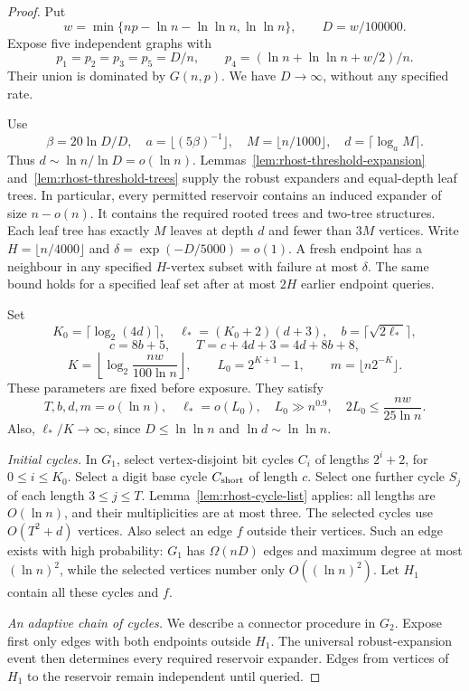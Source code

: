 \begin{proof}
Put
\[
 w=\min\{np-\ln n-\ln\ln n,\ln\ln n\},\qquad D=w/100000.
\]
Expose five independent graphs with
\[
 p_1=p_2=p_3=p_5=D/n,\qquad
 p_4=(\ln n+\ln\ln n+w/2)/n.
\]
Their union is dominated by $G(n,p)$.
We have $D\to\infty$, without any specified rate.

Use
\[
 \beta=20\ln D/D,\quad a=\lfloor(5\beta)^{-1}\rfloor,\quad
 M=\lfloor n/1000\rfloor,\quad d=\lceil\log_a M\rceil.
\]
Thus $d\sim\ln n/\ln D=o(\ln n)$.
Lemmas~\ref{lem:rhost-threshold-expansion} and~\ref{lem:rhost-threshold-trees} supply the robust expanders and equal-depth leaf trees.
In particular, every permitted reservoir contains an induced expander of size $n-o(n)$.
It contains the required rooted trees and two-tree structures.
Each leaf tree has exactly $M$ leaves at depth $d$ and fewer than $3M$ vertices.
Write $H=\lfloor n/4000\rfloor$ and $\delta=\exp(-D/5000)=o(1)$.
A fresh endpoint has a neighbour in any specified $H$-vertex subset with failure at most $\delta$.
The same bound holds for a specified leaf set after at most $2H$ earlier endpoint queries.

Set
\[
 K_0=\lceil\log_2(4d)\rceil,\quad
 \ell_*=(K_0+2)(d+3),\quad b=\lceil\sqrt{2\ell_*}\rceil,
\]
\[
 c=8b+5,\qquad T=c+4d+3=4d+8b+8,
\]
\[
 K=\left\lfloor\log_2\frac{nw}{100\ln n}\right\rfloor,
 \qquad L_0=2^{K+1}-1,\qquad m=\lfloor n2^{-K}\rfloor.
\]
These parameters are fixed before exposure.
They satisfy
\[
 T,b,d,m=o(\ln n),\quad \ell_*=o(L_0),\quad L_0\gg n^{0.9},
 \quad 2L_0\le\frac{nw}{25\ln n}.
\]
Also, $\ell_*/K\to\infty$, since $D\le\ln\ln n$ and $\ln d\sim\ln\ln n$.

\emph{Initial cycles.}
In $G_1$, select vertex-disjoint bit cycles $C_i$ of lengths $2^i+2$, for $0\le i\le K_0$.
Select a digit base cycle $C_{\rm short}$ of length $c$.
Select one further cycle $S_j$ of each length $3\le j\le T$.
Lemma~\ref{lem:rhost-cycle-list} applies: all lengths are $O(\ln n)$, and their multiplicities are at most three.
The selected cycles use $O(T^2+d)$ vertices.
Also select an edge $f$ outside their vertices.
Such an edge exists with high probability: $G_1$ has $\Omega(nD)$ edges and maximum degree at most $(\ln n)^2$,
while the selected vertices number only $O((\ln n)^2)$.
Let $H_1$ contain all these cycles and $f$.

\emph{An adaptive chain of cycles.}
We describe a connector procedure in $G_2$.
Expose first only edges with both endpoints outside $H_1$.
The universal robust-expansion event then determines every required reservoir expander.
Edges from vertices of $H_1$ to the reservoir remain independent until queried.


\end{proof}
